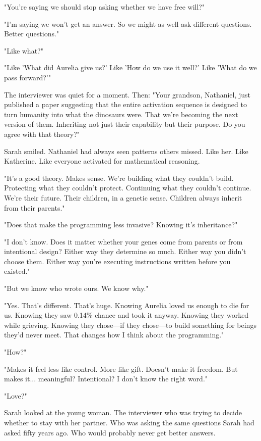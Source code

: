 "You're saying we should stop asking whether we have free will?"

"I'm saying we won't get an answer. So we might as well ask different questions. Better questions."

"Like what?"

"Like 'What did Aurelia give us?' Like 'How do we use it well?' Like 'What do we pass forward?'"

The interviewer was quiet for a moment. Then: "Your grandson, Nathaniel, just published a paper suggesting that the entire activation sequence is designed to turn humanity into what the dinosaurs were. That we're becoming the next version of them. Inheriting not just their capability but their purpose. Do you agree with that theory?"

Sarah smiled. Nathaniel had always seen patterns others missed. Like her. Like Katherine. Like everyone activated for mathematical reasoning.

"It's a good theory. Makes sense. We're building what they couldn't build. Protecting what they couldn't protect. Continuing what they couldn't continue. We're their future. Their children, in a genetic sense. Children always inherit from their parents."

"Does that make the programming less invasive? Knowing it's inheritance?"

"I don't know. Does it matter whether your genes come from parents or from intentional design? Either way they determine so much. Either way you didn't choose them. Either way you're executing instructions written before you existed."

"But we know who wrote ours. We know why."

"Yes. That's different. That's huge. Knowing Aurelia loved us enough to die for us. Knowing they saw 0.14\% chance and took it anyway. Knowing they worked while grieving. Knowing they chose—if they chose—to build something for beings they'd never meet. That changes how I think about the programming."

"How?"

"Makes it feel less like control. More like gift. Doesn't make it freedom. But makes it... meaningful? Intentional? I don't know the right word."

"Love?"

Sarah looked at the young woman. The interviewer who was trying to decide whether to stay with her partner. Who was asking the same questions Sarah had asked fifty years ago. Who would probably never get better answers.

